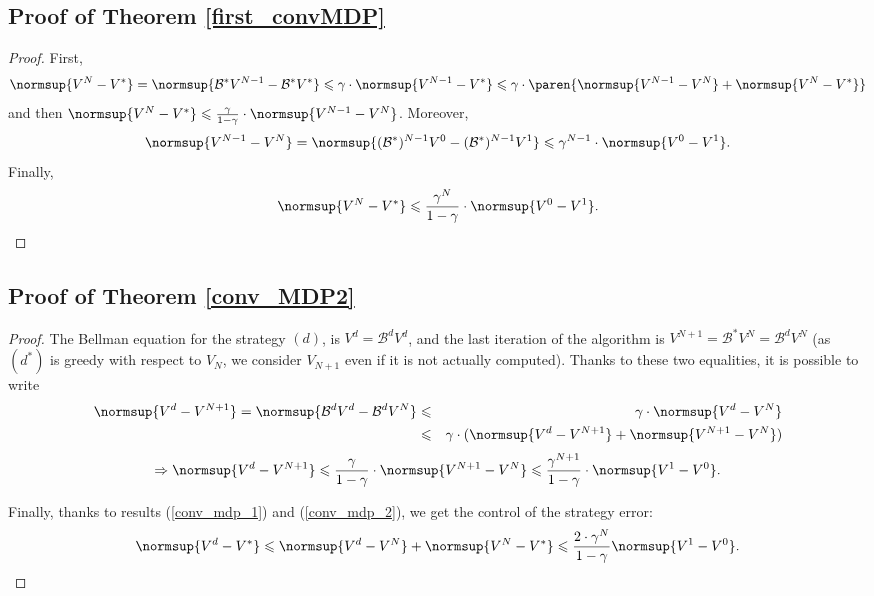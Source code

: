 \subsection{Proof of Theorem \ref{first_convMDP}}
\label{first_convMDP_RETURN}
\begin{proof}
First,
\[ \normsup{V^N -V^*} = \normsup{ \mathcal{B}^* V^{N-1} - \mathcal{B}^* V^*} \leqslant \gamma \cdot \normsup{ V^{N-1} - V^* } \leqslant \gamma \cdot \paren{ \normsup{V^{N-1} - V^N} + \normsup{V^N - V^*} } \] 
and then $\normsup{V^N -V^*} \leqslant \frac{\gamma}{1-\gamma} \cdot \normsup{ V^{N-1} - V^{N} }$.
Moreover, 
\[ \normsup{ V^{N-1} - V^{N} } = \normsup{ (\mathcal{B}^*)^{N-1} V^{0} - (\mathcal{B}^*)^{N-1} V^{1} } \leqslant \gamma^{N-1} \cdot \normsup{ V^{0} - V^{1} }.\]
Finally,
\begin{equation*} 
\normsup{V^N -V^*} \leqslant \frac{\gamma^N}{1-\gamma} \cdot \normsup{ V^{0} - V^{1} }. 
\end{equation*}
\end{proof}








\subsection{Proof of Theorem \ref{conv_MDP2}}
\label{conv_MDP2_RETURN}
\begin{proof}
The Bellman equation for the strategy $(d)$,
is $V^d = \mathcal{B}^d V^d$, 
and the last iteration of the algorithm is 
$V^{N+1} = \mathcal{B}^* V^{N} = \mathcal{B}^d V^{N}$ 
(as $(d^*)$ is greedy with respect to $V_N$,
we consider $V_{N+1}$ even if it is not actually computed). 
Thanks to these two equalities,
it is possible to write
\begin{eqnarray}
\nonumber \normsup{V^d - V^{N+1}} = \normsup{\mathcal{B}^d V^d - \mathcal{B}^d V^{N}} & \leqslant & \gamma \cdot \normsup{V^d - V^{N}} \\
\nonumber & \leqslant & \gamma \cdot (\normsup{V^d - V^{N+1}} + \normsup{V^{N+1} - V^{N}}) 
\end{eqnarray}
\begin{equation}
\Rightarrow  \normsup{V^d - V^{N+1}} \leqslant \frac{\gamma}{1 - \gamma} \cdot \normsup{V^{N+1} -V^{N}} \leqslant \frac{\gamma^{N+1}}{1 - \gamma} \cdot \normsup{V^1 -V^{0}}.
\label{conv_mdp_2} 
\end{equation}

Finally, thanks to results (\ref{conv_mdp_1}) and (\ref{conv_mdp_2}), 
we get the control of the strategy error:
\[ \normsup{ V^d - V^* } \leqslant \normsup{ V^d - V^N } + \normsup{ V^N - V^* } \leqslant \frac{2 \cdot \gamma^N}{1-\gamma} \normsup{ V^1 - V^0 }. \]
\end{proof}










